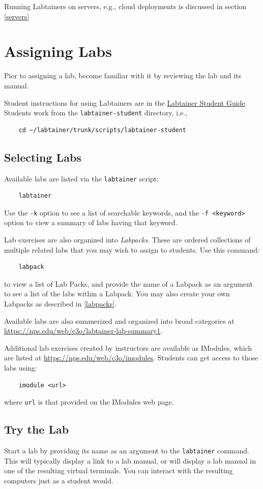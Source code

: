 \documentclass[12pt]{article}
\begin{document}
Running Labtainers on servers, e.g., cloud deployments is discussed in
section \ref{servers}

\section{Assigning Labs}
Pior to assigning a lab, become familiar with it by reviewing the lab and its manual.

Student instructions for using Labtainers are in the \underline{Labtainer Student Guide}.  
Students work from the {\tt labtainer-student} directory, i.e.,
\begin{verbatim}
    cd ~/labtainer/trunk/scripts/labtainer-student
\end{verbatim}
\subsection{Selecting Labs}
Available labs are listed via the {\tt labtainer} script:
\begin{verbatim}
    labtainer
\end{verbatim}
\noindent Use the {\tt -k} option to see a list of searchable keywords, and the {\tt -f <keyword>} option to view a summary
of labs having that keyword.

Lab exercises are also organized into \textit{Labpacks}. These are ordered collections of multiple related labs that you may
wish to assign to students.  Use this command:
\begin{verbatim}
    labpack
\end{verbatim}
\noindent to view a list of Lab Packs, and provide the name of a Labpack as an argument to see a list of the labs
within a Labpack.  You may also create your own Labpacks as described in \ref{labpacks}. 

Available labs are also summerized and organized into broad categories at \url{https://nps.edu/web/c3o/labtainer-lab-summary1}.

Additional lab exercises created by instructors are available as IModules, which are listed at \url{https://nps.edu/web/c3o/imodules}.
Students can get access to those labs using:
\begin{verbatim}
    imodule <url>
\end{verbatim}
\noindent where {\tt url} is that provided on the IModules web page.

\subsection{Try the Lab}
Start a lab by providing its name as an argument to the {\tt labtainer} command.
This will typically display a link to a lab manual, or will display a lab manual in one of
the resulting virtual terminals.  You can interact with the resulting computers just as a
student would.
\end{document}
